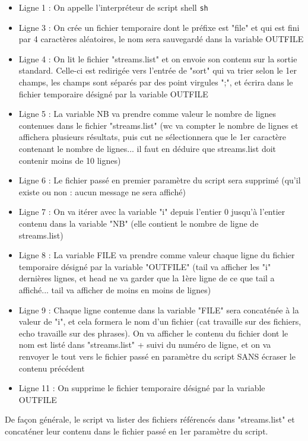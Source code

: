 \documentclass[11pt,a4paper]{article}
\begin{document}
\bigskip

\begin{itemize}
\item Ligne 1 : On appelle l'interpréteur de script shell \texttt{sh}
\item Ligne 3 : On crée un fichier temporaire dont le préfixe est "file" et qui est fini par 4 caractères aléatoires, le nom sera sauvegardé dans la variable OUTFILE
\item Ligne 4 : On lit le fichier "streams.list" et on envoie son contenu sur la sortie standard. Celle-ci est redirigée vers l'entrée de "sort" qui va trier selon le 1er champs, les champs sont séparés par des point virgules ";", et écrira dans le fichier temporaire désigné par la variable OUTFILE
\item Ligne 5 : La variable NB va prendre comme valeur le nombre de lignes contenues dans le fichier "streams.list" (wc va compter le nombre de lignes et affichera plusieurs résultats, puis cut ne sélectionnera que le 1er caractère contenant le nombre de lignes... il faut en déduire que streams.list doit contenir moins de 10 lignes)
\item Ligne 6 : Le fichier passé en premier paramètre du script sera supprimé (qu'il existe ou non : aucun message ne sera affiché)
\item Ligne 7 : On va itérer avec la variable "i" depuis l'entier 0 jusqu'à l'entier contenu dans la variable "NB" (elle contient le nombre de ligne de streams.list)
\item Ligne 8 : La variable FILE va prendre comme valeur chaque ligne du fichier temporaire désigné par la variable "OUTFILE" (tail va afficher les "i" dernières lignes, et head ne va garder que la 1ère ligne de ce que tail a affiché... tail va afficher de moins en moins de lignes)
\item Ligne 9 : Chaque ligne contenue dans la variable "FILE" sera concaténée à la valeur de "i", et cela formera le nom d'un fichier (cat travaille sur des fichiers, echo travaille sur des phrases). On va afficher le contenu du fichier dont le nom est listé dans "streams.list" + suivi du numéro de ligne, et on va renvoyer le tout vers le fichier passé en paramètre du script SANS écraser le contenu précédent
\item Ligne 11 : On supprime le fichier temporaire désigné par la variable OUTFILE
\end{itemize}

\bigskip

De façon générale, le script va lister des fichiers référencés dans "streams.list" et concaténer leur contenu dans le fichier passé en 1er paramètre du script.
\end{document}
